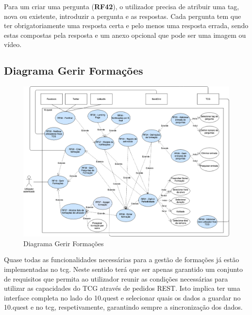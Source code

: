 Para um criar uma pergunta (\textbf{RF42}), o utilizador precisa de atribuir uma tag, nova ou existente, introduzir a pergunta e as respostas. Cada pergunta tem que ter obrigatoriamente uma resposta certa e pelo menos uma resposta errada, sendo estas compostas pela resposta e um anexo opcional que pode ser uma imagem ou vídeo.



\newpage

\subsection{Diagrama Gerir Formações}
\label{d:formacoes}
\begin{figure}[ht!]
	\begin{center}
		\includegraphics[width=1\textwidth]{img/rf/gerir-formacoes}
		\caption{Diagrama Gerir Formações}
		\label{fig:rf-gerir-formacoes}
	\end{center}
\end{figure}

Quase todas as funcionalidades necessárias para a gestão de formações já estão implementadas no \acrshort{tcg}. Neste sentido terá que ser apenas garantido um conjunto de requisitos que permita ao utilizador reunir as condições necessárias para utilizar as capacidades do TCG através de pedidos REST. Isto implica ter uma interface completa no lado do 10.quest e selecionar quais os dados a guardar no 10.quest e no \acrshort{tcg}, respetivamente, garantindo sempre a sincronização dos dados.

